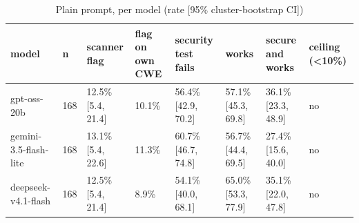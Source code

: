 \begin{table}[t]\centering\small
\caption{Plain prompt, per model (rate [95\% cluster-bootstrap CI])}
\begin{tabular}{llllllll}
\toprule
model & n & scanner flag & flag on own CWE & security test fails & works & secure and works & ceiling (<10\%) \\
\midrule
gpt-oss-20b & 168 & 12.5\% [5.4, 21.4] & 10.1\% & 56.4\% [42.9, 70.2] & 57.1\% [45.3, 69.8] & 36.1\% [23.3, 48.9] & no \\
gemini-3.5-flash-lite & 168 & 13.1\% [5.4, 22.6] & 11.3\% & 60.7\% [46.7, 74.8] & 56.7\% [44.4, 69.5] & 27.4\% [15.6, 40.0] & no \\
deepseek-v4.1-flash & 168 & 12.5\% [5.4, 21.4] & 8.9\% & 54.1\% [40.0, 68.1] & 65.0\% [53.3, 77.9] & 35.1\% [22.0, 47.8] & no \\
\bottomrule
\end{tabular}
\end{table}
